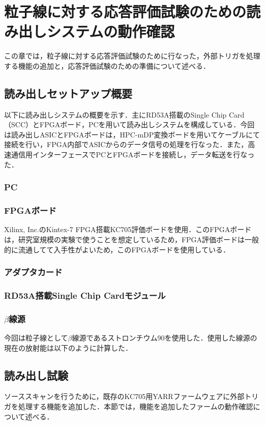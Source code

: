\chapter{粒子線に対する応答評価試験のための読み出しシステムの動作確認}
この章では，粒子線に対する応答評価試験のために行なった，外部トリガを処理する機能の追加と，応答評価試験のための準備について述べる．

\section{読み出しセットアップ概要}
以下に読み出しシステムの概要を示す．主にRD53A搭載のSingle Chip Card（SCC）とFPGAボード，PCを用いて読み出しシステムを構成している．今回は読み出しASICとFPGAボードは，HPC-mDP変換ボードを用いてケーブルにて接続を行い，FPGA内部でASICからのデータ信号の処理を行なった．また，高速通信用インターフェースでPCとFPGAボードを接続し，データ転送を行なった．\\

\subsection*{PC}
\subsection*{FPGAボード}
Xilinx, Inc.のKintex-7 FPGA搭載KC705評価ボードを使用．このFPGAボードは，研究室規模の実験で使うことを想定しているため，FPGA評価ボードは一般的に流通してて入手性がよいため，このFPGAボードを使用している．
\subsection*{アダプタカード}
\subsection*{RD53A搭載Single Chip Cardモジュール}
\subsection*{$\beta$線源}
今回は粒子線として$\beta$線源であるストロンチウム90を使用した．使用した線源の現在の放射能は以下のように計算した．

\section{読み出し試験}
ソーススキャンを行うために，既存のKC705用YARRファームウェアに外部トリガを処理する機能を追加した．本節では，機能を追加したファームの動作確認について述べる．

